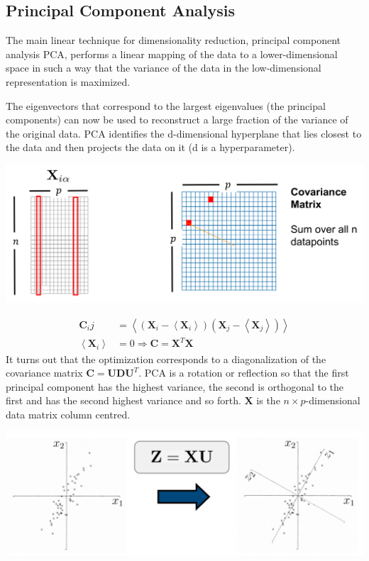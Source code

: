 \documentclass[11pt]{article}
\theoremstyle{definition}
\begin{document}
\subsection{Principal Component Analysis}
The main linear technique for dimensionality reduction, principal component analysis PCA, performs a linear mapping of the data to a lower-dimensional space in such a way that the variance of the data in the low-dimensional representation is maximized.

The eigenvectors that correspond to the largest eigenvalues (the principal components) can now be used to reconstruct a large fraction of the variance of the original data. PCA identifies the d-dimensional hyperplane that lies closest to the data and then projects the data on it (d is a hyperparameter).

\begin{center}
	\includegraphics[width=0.7\linewidth]{img/input_covariance_matrix}
\end{center}

\begin{align*}
	\textbf{C}_ij &= \left\langle (\textbf{X}_i - \left\langle \textbf{X}_i \right\rangle) (\textbf{X}_j - \left\langle \textbf{X}_j \right\rangle) \right\rangle\\
	\left\langle \textbf{X}_i \right\rangle &= 0 \Rightarrow \textbf{C} = \textbf{X}^T \textbf{X}
\end{align*}
It turns out that the optimization corresponds to a diagonalization of the covariance matrix $  \textbf{C} = \textbf{U}\textbf{D}\textbf{U}^T$. PCA is a rotation or reflection so that the first principal component has the highest variance, the second is orthogonal to the first and has the second highest variance and so forth. $\textbf{X}$ is the $n\times p$-dimensional data matrix column centred.
\begin{center}
	\includegraphics[width=0.7\linewidth]{img/PCA_X}
\end{center}
\end{document}
